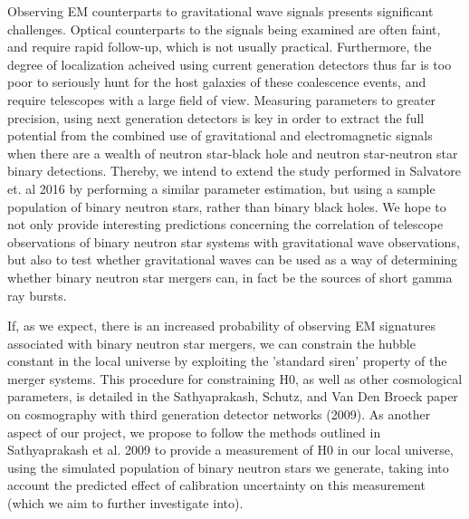 \documentclass{article}
\begin{document}
Observing EM counterparts to gravitational wave signals presents significant challenges.  Optical counterparts to the signals being examined are often faint, and require rapid follow-up, which is not usually practical.  Furthermore, the degree of localization acheived using current generation detectors thus far is too poor to seriously hunt for the host galaxies of these coalescence events, and require telescopes with a large field of view.  Measuring parameters to greater precision, using next generation detectors is key in order to extract the full potential from the combined use of gravitational and electromagnetic signals when there are a wealth of neutron star-black hole and neutron star-neutron star binary detections. Thereby, we intend to extend the study performed in Salvatore et. al 2016 by performing a similar parameter estimation, but using a sample population of binary neutron stars, rather than binary black holes.  We hope to not only provide interesting predictions concerning the correlation of telescope observations of binary neutron star systems with gravitational wave observations, but also to test whether gravitational waves can be used as a way of determining whether binary neutron star mergers can, in fact be the sources of short gamma ray bursts.

If, as we expect, there is an increased probability of observing EM signatures associated with binary neutron star mergers, we can constrain the hubble constant in the local universe by exploiting the 'standard siren' property of the merger systems.  This procedure for constraining H0, as well as other cosmological parameters, is detailed in the Sathyaprakash, Schutz, and Van Den Broeck paper on cosmography with third generation detector networks (2009).  As another aspect of our project, we propose to follow the methods outlined in Sathyaprakash et al. 2009 to provide a measurement of H0 in our local universe, using the simulated population of binary neutron stars we generate, taking into account the predicted effect of calibration uncertainty on this measurement (which we aim to further investigate into).
\end{document}
